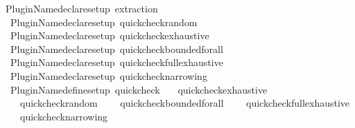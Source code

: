 \begin{isabellebody}
\isanewline
\isanewline
{}\isamarkupfalse%
\ {\isacartoucheopen}Plugin{\isacharunderscore}{\kern0pt}Name{\isachardot}{\kern0pt}declare{\isacharunderscore}{\kern0pt}setup\ \isactrlbinding {\isasymopen}extraction{\isasymclose}{\isacartoucheclose}\isanewline
\isanewline
{}\isamarkupfalse%
\ {\isacartoucheopen}\isanewline
\ \ Plugin{\isacharunderscore}{\kern0pt}Name{\isachardot}{\kern0pt}declare{\isacharunderscore}{\kern0pt}setup\ \isactrlbinding {\isasymopen}quickcheck{\isacharunderscore}{\kern0pt}random{\isasymclose}{\isacharsemicolon}{\kern0pt}\isanewline
\ \ Plugin{\isacharunderscore}{\kern0pt}Name{\isachardot}{\kern0pt}declare{\isacharunderscore}{\kern0pt}setup\ \isactrlbinding {\isasymopen}quickcheck{\isacharunderscore}{\kern0pt}exhaustive{\isasymclose}{\isacharsemicolon}{\kern0pt}\isanewline
\ \ Plugin{\isacharunderscore}{\kern0pt}Name{\isachardot}{\kern0pt}declare{\isacharunderscore}{\kern0pt}setup\ \isactrlbinding {\isasymopen}quickcheck{\isacharunderscore}{\kern0pt}bounded{\isacharunderscore}{\kern0pt}forall{\isasymclose}{\isacharsemicolon}{\kern0pt}\isanewline
\ \ Plugin{\isacharunderscore}{\kern0pt}Name{\isachardot}{\kern0pt}declare{\isacharunderscore}{\kern0pt}setup\ \isactrlbinding {\isasymopen}quickcheck{\isacharunderscore}{\kern0pt}full{\isacharunderscore}{\kern0pt}exhaustive{\isasymclose}{\isacharsemicolon}{\kern0pt}\isanewline
\ \ Plugin{\isacharunderscore}{\kern0pt}Name{\isachardot}{\kern0pt}declare{\isacharunderscore}{\kern0pt}setup\ \isactrlbinding {\isasymopen}quickcheck{\isacharunderscore}{\kern0pt}narrowing{\isasymclose}{\isacharsemicolon}{\kern0pt}\isanewline
{\isacartoucheclose}\isanewline
{}\isamarkupfalse%
\ {\isacartoucheopen}\isanewline
\ \ Plugin{\isacharunderscore}{\kern0pt}Name{\isachardot}{\kern0pt}define{\isacharunderscore}{\kern0pt}setup\ \isactrlbinding {\isasymopen}quickcheck{\isasymclose}\isanewline
\ \ \ {\isacharbrackleft}{\kern0pt}\isactrlplugin {\isasymopen}quickcheck{\isacharunderscore}{\kern0pt}exhaustive{\isasymclose}{\isacharcomma}{\kern0pt}\isanewline
\ \ \ \ \isactrlplugin {\isasymopen}quickcheck{\isacharunderscore}{\kern0pt}random{\isasymclose}{\isacharcomma}{\kern0pt}\isanewline
\ \ \ \ \isactrlplugin {\isasymopen}quickcheck{\isacharunderscore}{\kern0pt}bounded{\isacharunderscore}{\kern0pt}forall{\isasymclose}{\isacharcomma}{\kern0pt}\isanewline
\ \ \ \ \isactrlplugin {\isasymopen}quickcheck{\isacharunderscore}{\kern0pt}full{\isacharunderscore}{\kern0pt}exhaustive{\isasymclose}{\isacharcomma}{\kern0pt}\isanewline
\ \ \ \ \isactrlplugin {\isasymopen}quickcheck{\isacharunderscore}{\kern0pt}narrowing{\isasymclose}{\isacharbrackright}{\kern0pt}\isanewline

\end{isabellebody}

